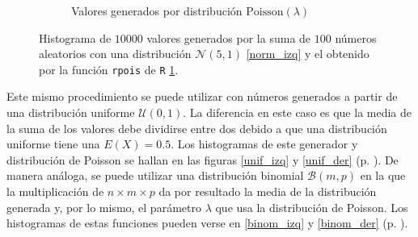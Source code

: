 \documentclass[paper=leter, fontsize=11pt]{scrartcl}
\numberwithin{equation}{section}		%
\numberwithin{figure}{section}			%
\numberwithin{table}{section}				%
\begin{document}
\begin{figure}
\begin{subfigure}{0.5\textwidth}
        \caption{Valores generados por distribución $\text{Poisson}(\lambda)$}
        \label{norm_der}
    \end{subfigure}
    \caption{Histograma de $10000$ valores generados por la suma de $100$ números aleatorios con una distribución $\mathcal{N}(5, 1)$ \ref{norm_izq} y el obtenido por la función \texttt{rpois} de \texttt{R} \ref{norm_der}.}
    \label{norm}
\end{figure}

Este mismo procedimiento se puede utilizar con números generados a partir de una distribución uniforme $\mathcal{U}(0, 1)$. La diferencia en este caso es que la media de la suma de los valores debe dividirse entre dos debido a que una distribución uniforme tiene una $E(X) = 0.5$. Los histogramas de este generador y distribución de Poisson se hallan en las figuras \ref{unif_izq} y \ref{unif_der} (p. \pageref{unif}). De manera análoga, se puede utilizar una distribución binomial $\mathcal{B}(m, p)$ en la que la multiplicación de $n \times m \times p$ da por resultado la media de la distribución generada y, por lo mismo, el parámetro $\lambda$ que usa la distribución de Poisson. Los histogramas de estas funciones pueden verse en \ref{binom_izq} y \ref{binom_der} (p. \pageref{unif}).
\end{document}
